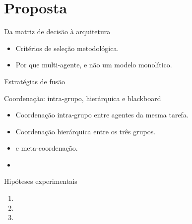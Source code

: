 
\section{Proposta}

\begin{frame}{Da matriz de decisão à arquitetura}
  \begin{itemize}
    \item Critérios de seleção metodológica.
    \item Por que multi-agente, e não um modelo monolítico.
  \end{itemize}
\end{frame}

\begin{frame}[plain]
  \centering
\end{frame}

\begin{frame}{Estratégias de fusão}
\end{frame}

\begin{frame}{Coordenação: intra-grupo, hierárquica e blackboard}
  \begin{itemize}
    \item Coordenação intra-grupo entre agentes da mesma tarefa.
    \item Coordenação hierárquica entre os três grupos.
    \item {} e meta-coordenação.
    \item {}
  \end{itemize}
\end{frame}

\begin{frame}{Hipóteses experimentais}
  \begin{enumerate}
    \item {}
    \item {}
    \item {}
  \end{enumerate}
\end{frame}
